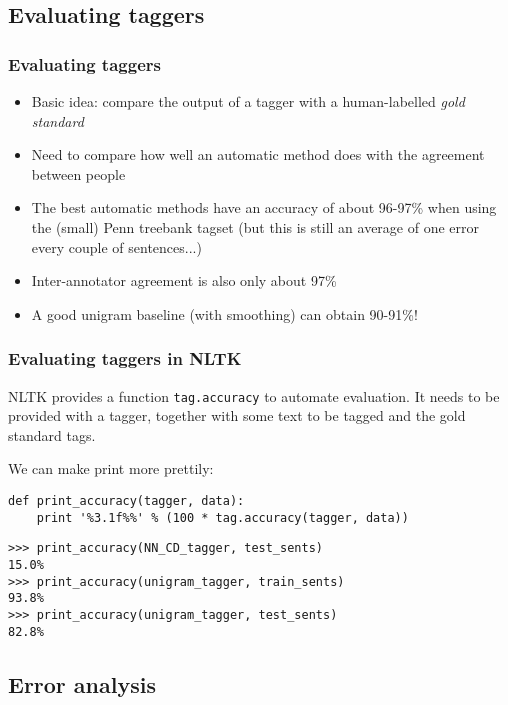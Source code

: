 \documentclass{beamer}             %
\begin{document}
\subsection{Evaluating taggers}

\begin{frame}
  \frametitle{Evaluating taggers}
  \begin{itemize}
  \item Basic idea: compare the output of a tagger with a
    human-labelled \emph{gold standard}
  \item Need to compare how well an automatic method does with the
    agreement between people
  \item The best automatic methods have an accuracy of about 96-97\%
    when using the (small) Penn treebank tagset (but this is still an
    average of one error every couple of sentences...)
  \item Inter-annotator agreement is also only about 97\% 
  \item A good unigram baseline (with smoothing) can obtain 90-91\%!
  \end{itemize}
\end{frame}

\begin{frame}[fragile]
  \frametitle{Evaluating taggers in NLTK}
  NLTK provides a function \texttt{tag.accuracy} to automate
  evaluation.  It needs to be provided with a tagger, together with
  some text to be tagged and the gold standard tags.  
  
  \pause
  We can make
  print more prettily:
\begin{verbatim}
def print_accuracy(tagger, data):
    print '%3.1f%%' % (100 * tag.accuracy(tagger, data))
\end{verbatim}

  \pause
\begin{verbatim}
>>> print_accuracy(NN_CD_tagger, test_sents)
15.0%
>>> print_accuracy(unigram_tagger, train_sents)
93.8%
>>> print_accuracy(unigram_tagger, test_sents)
82.8%
\end{verbatim}
\end{frame}

\subsection{Error analysis} 
\end{document}
